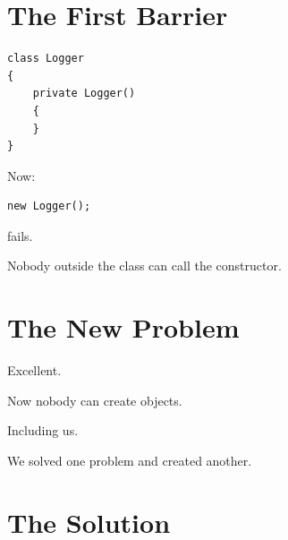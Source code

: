 \documentclass[11pt,a4paper]{book}
\begin{document}

\section{The First Barrier}

\begin{verbatim}
class Logger
{
    private Logger()
    {
    }
}
\end{verbatim}


Now:

\begin{verbatim}
new Logger();
\end{verbatim}


fails.


Nobody outside the class
can call the constructor.


\section{The New Problem}

Excellent.


Now nobody can create objects.


Including us.


We solved one problem and
created another.


\section{The Solution}
\end{document}
